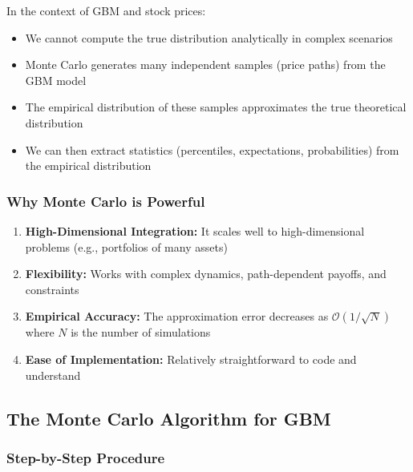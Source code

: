 \documentclass[12pt,a4paper]{article}
\begin{document}
In the context of GBM and stock prices:
\begin{itemize}
    \item We cannot compute the true distribution analytically in complex scenarios
    \item Monte Carlo generates many independent samples (price paths) from the GBM model
    \item The empirical distribution of these samples approximates the true theoretical distribution
    \item We can then extract statistics (percentiles, expectations, probabilities) from the empirical distribution
\end{itemize}

\subsubsection{Why Monte Carlo is Powerful}

\begin{enumerate}
    \item \textbf{High-Dimensional Integration:} It scales well to high-dimensional problems (e.g., portfolios of many assets)
    \item \textbf{Flexibility:} Works with complex dynamics, path-dependent payoffs, and constraints
    \item \textbf{Empirical Accuracy:} The approximation error decreases as $\mathcal{O}(1/\sqrt{N})$ where $N$ is the number of simulations
    \item \textbf{Ease of Implementation:} Relatively straightforward to code and understand
\end{enumerate}

\subsection{The Monte Carlo Algorithm for GBM}

\subsubsection{Step-by-Step Procedure}
\end{document}
